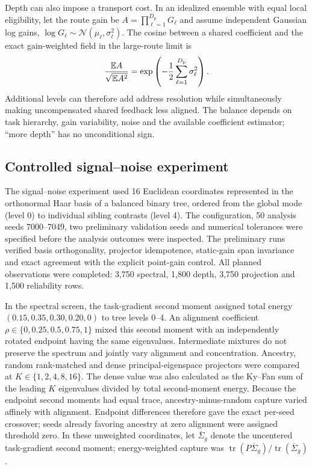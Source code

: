Depth can also impose a transport cost. In an idealized ensemble with equal
local eligibility, let the route gain be
$A=\prod_{\ell=1}^{D_{\mathrm{p}}}G_\ell$ and assume independent Gaussian
log gains, $\log G_\ell\sim\mathcal N(\mu_\ell,\sigma_\ell^2)$. The cosine between a shared
coefficient and the exact gain-weighted field in the large-route limit is
\begin{equation}
\frac{\mathbb{E} A}{\sqrt{\mathbb{E} A^2}}
=\exp\left(-\frac12\sum_{\ell=1}^{D_{\mathrm{p}}}\sigma_\ell^2\right).
\label{eq:s_depth_transport_penalty}
\end{equation}
Additional levels can therefore add address resolution while simultaneously
making uncompensated shared feedback less aligned. The balance depends on
task hierarchy, gain variability, noise and the available coefficient
estimator; ``more depth'' has no unconditional sign.

\subsection{Controlled signal--noise experiment}

The signal--noise experiment used 16 Euclidean coordinates represented in the
orthonormal Haar basis of a balanced binary tree, ordered from the global mode
(level 0) to individual sibling contrasts (level 4). The configuration,
50 analysis seeds 7000--7049, two preliminary validation seeds and numerical
tolerances were specified before the analysis outcomes were inspected. The
preliminary runs verified basis orthogonality, projector idempotence,
static-gain span invariance and exact agreement with the explicit point-gain
control. All planned observations were completed: 3,750 spectral, 1,800
depth, 3,750 projection and 1,500 reliability rows.

In the spectral screen, the task-gradient second moment assigned total energy
$(0.15,0.35,0.30,0.20,0)$ to tree levels 0--4. An alignment coefficient
$\rho\in\{0,0.25,0.5,0.75,1\}$ mixed this second moment with an independently
rotated endpoint having the same eigenvalues. Intermediate mixtures do not
preserve the spectrum and jointly vary alignment and concentration.
Ancestry, random rank-matched
and dense principal-eigenspace projectors were compared at
$K\in\{1,2,4,8,16\}$. The dense value was also calculated as the Ky--Fan sum
of the leading $K$ eigenvalues divided by total second-moment energy. Because the
endpoint second moments had equal trace, ancestry-minus-random capture varied
affinely with alignment. Endpoint differences therefore gave the exact
per-seed crossover; seeds already favoring ancestry at zero alignment were
assigned threshold zero. In these unweighted coordinates, let
\(\overline\Sigma_g\) denote the uncentered task-gradient second moment; energy-weighted capture was
$\operatorname{tr}(P\overline\Sigma_g)/\operatorname{tr}(\overline\Sigma_g)$.

